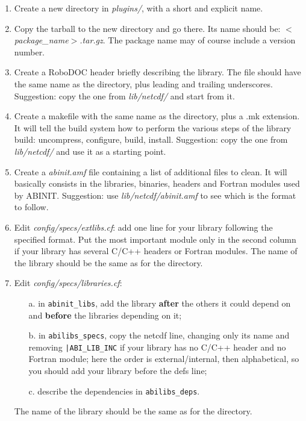 \begin{enumerate}
\item Create a new directory in \textit{plugins/}, with a short and explicit
name. 
\item Copy the tarball to the new directory and go there. Its name should
be: \textit{$<$package\_name$>$.tar.gz}. The package name may of
course include a version number. 
\item Create a RoboDOC header briefly describing the library. The file should
have the same name as the directory, plus leading and trailing underscores.
Suggestion: copy the one from \textit{lib/netcdf/} and start from
it. 
\item Create a makefile with the same name as the directory, plus a \textquotedbl{}.mk\textquotedbl{}
extension. It will tell the build system how to perform the various
steps of the library build: uncompress, configure, build, install.
Suggestion: copy the one from \textit{lib/netcdf/} and use it as a
starting point. 
\item Create a \textit{abinit.amf} file containing a list of additional
files to clean. It will basically consists in the libraries, binaries,
headers and Fortran modules used by ABINIT. Suggestion: use \textit{lib/netcdf/abinit.amf}
to see which is the format to follow. 
\item Edit \textit{config/specs/extlibs.cf}: add one line for your library
following the specified format. Put the most important module only
in the second column if your library has several C/C++ headers or
Fortran modules. The name of the library should be the same as for
the directory. 
\item Edit \textit{config/specs/libraries.cf}: 

\begin{itemize}
\item [a. ] in \texttt{abinit\_libs}, add the library \textbf{after} the
others it could depend on and \textbf{before} the libraries depending
on it; 
\item [b. ] in \texttt{abilibs\_specs}, copy the \textquotedbl{}netcdf\textquotedbl{}
line, changing only its name and removing \texttt{|ABI\_LIB\_INC}
if your library has no C/C++ header and no Fortran module; here the
order is external/internal, then alphabetical, so you should add your
library before the \textquotedbl{}defs\textquotedbl{} line; 
\item [c. ] describe the dependencies in \texttt{abilibs\_deps}. 
\end{itemize}
The name of the library should be the same as for the directory. 


\end{enumerate}
